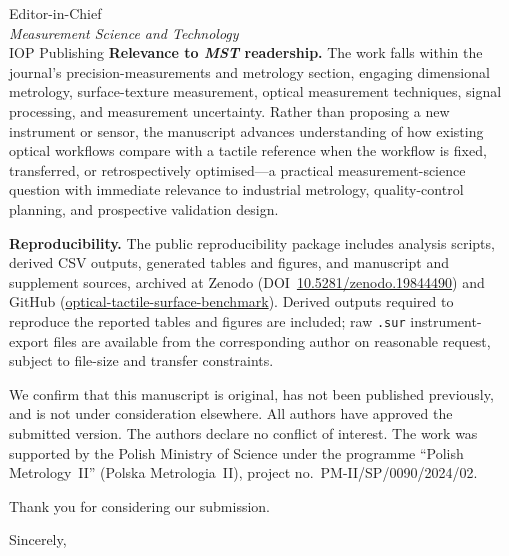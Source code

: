 \documentclass[10pt]{letter}
\begin{document}
\begin{letter}{Editor-in-Chief\\
\textit{Measurement Science and Technology}\\
IOP Publishing}
\textbf{Relevance to \textit{MST} readership.}
The work falls within the journal's precision-measurements and metrology section, engaging dimensional metrology, surface-texture measurement, optical measurement techniques, signal processing, and measurement uncertainty. Rather than proposing a new instrument or sensor, the manuscript advances understanding of how existing optical workflows compare with a tactile reference when the workflow is fixed, transferred, or retrospectively optimised---a practical measurement-science question with immediate relevance to industrial metrology, quality-control planning, and prospective validation design.

\textbf{Reproducibility.}
The public reproducibility package includes analysis scripts, derived CSV outputs, generated tables and figures, and manuscript and supplement sources, archived at Zenodo (DOI~\href{https://doi.org/10.5281/zenodo.19844490}{10.5281/zenodo.19844490}) and GitHub (\href{https://github.com/dawidkucharski/optical-tactile-surface-benchmark}{optical-tactile-surface-benchmark}). Derived outputs required to reproduce the reported tables and figures are included; raw \texttt{.sur} instrument-export files are available from the corresponding author on reasonable request, subject to file-size and transfer constraints.

We confirm that this manuscript is original, has not been published previously, and is not under consideration elsewhere. All authors have approved the submitted version. The authors declare no conflict of interest. The work was supported by the Polish Ministry of Science under the programme ``Polish Metrology~II'' (Polska Metrologia~II), project no.~PM-II/SP/0090/2024/02.

Thank you for considering our submission.

\closing{Sincerely,}

\end{letter}
\end{document}
